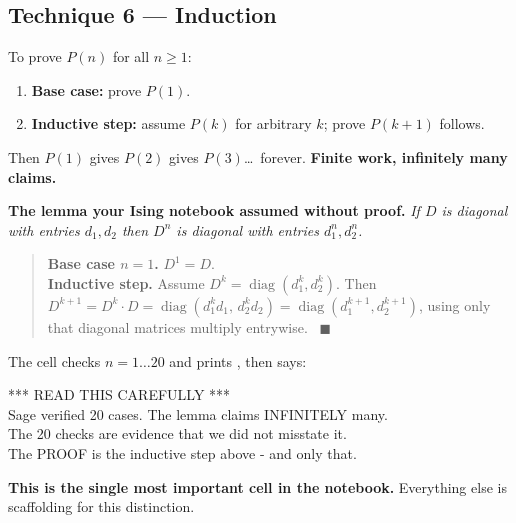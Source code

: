 \subsection{Technique 6 --- Induction \ \ }

\begin{techbox}[title={Shape --- the one that beats infinity}]
To prove $P(n)$ for all $n\ge1$:
\begin{enumerate}[label=\textbf{\arabic*.}]
\item \textbf{Base case:} prove $P(1)$.
\item \textbf{Inductive step:} assume $P(k)$ for arbitrary $k$; prove $P(k+1)$ follows.
\end{enumerate}
Then $P(1)$ gives $P(2)$ gives $P(3)$\ldots\ forever. \textbf{Finite work, infinitely many claims.}
\end{techbox}

\noindent\textbf{The lemma your Ising notebook assumed without proof.}
\emph{If $D$ is diagonal with entries $d_1,d_2$ then $D^n$ is diagonal with entries $d_1^n,d_2^n$.}

\begin{quote}
\textbf{Base case $n=1$.} $D^1=D$. \checkmark\\[3pt]
\textbf{Inductive step.} Assume $D^k=\operatorname{diag}(d_1^k,d_2^k)$. Then
$D^{k+1}=D^k\!\cdot\! D=\operatorname{diag}(d_1^kd_1,\,d_2^kd_2)=\operatorname{diag}(d_1^{k+1},d_2^{k+1})$,
using only that diagonal matrices multiply entrywise. \checkmark\ $\blacksquare$
\end{quote}

\begin{warnbox}[title={\cell{17} is where the lesson lands}]
The cell checks $n=1\ldots20$ and prints , then says:
\begin{cellbox}
*** READ THIS CAREFULLY ***\\
Sage verified 20 cases. The lemma claims INFINITELY many.\\
The 20 checks are evidence that we did not misstate it.\\
The PROOF is the inductive step above - and only that.
\end{cellbox}
\vspace{4pt}
\textbf{This is the single most important cell in the notebook.} Everything else is scaffolding for
this distinction.
\end{warnbox}
